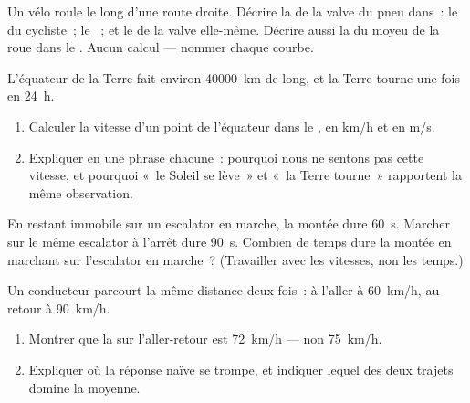 \begin{exercise}[$\star\star$]\label{exo:g10:relative-motion:9}
Un vélo roule le long d'une route droite. Décrire la
 de la valve du pneu dans~: le  du
cycliste~; le ~; et le  de la
valve elle-même. Décrire aussi la  du moyeu de
la roue dans le . Aucun calcul --- nommer
chaque courbe.
\end{exercise}

\begin{exercise}[$\star\star$]\label{exo:g10:relative-motion:10}
L'équateur de la Terre fait environ \qty{40000}{km} de long, et la
Terre tourne une fois en \qty{24}{h}.
\begin{enumerate}
  \item Calculer la vitesse d'un point de l'équateur dans le
        , en \unit{km/h} et en
        \unit{m/s}.
  \item Expliquer en une phrase chacune~: pourquoi nous ne sentons pas
        cette vitesse, et pourquoi «~le Soleil se lève~» et «~la Terre
        tourne~» rapportent la même observation.
\end{enumerate}
\end{exercise}

\begin{exercise}[$\star\star$]\label{exo:g10:relative-motion:11}
En restant immobile sur un escalator en marche, la montée dure
\qty{60}{s}. Marcher sur le même escalator à l'arrêt dure
\qty{90}{s}. Combien de temps dure la montée en marchant sur
l'escalator en marche~? (Travailler avec les vitesses, non les
temps.)
\end{exercise}

\begin{exercise}[$\star\star\star$]\label{exo:g10:relative-motion:12}
Un conducteur parcourt la même distance deux fois~: à l'aller à
\qty{60}{km/h}, au retour à \qty{90}{km/h}.
\begin{enumerate}
  \item Montrer que la  sur l'aller-retour est
        \qty{72}{km/h} --- non \qty{75}{km/h}.
  \item Expliquer où la réponse naïve se trompe, et indiquer lequel
        des deux trajets domine la moyenne.
\end{enumerate}
\end{exercise}

